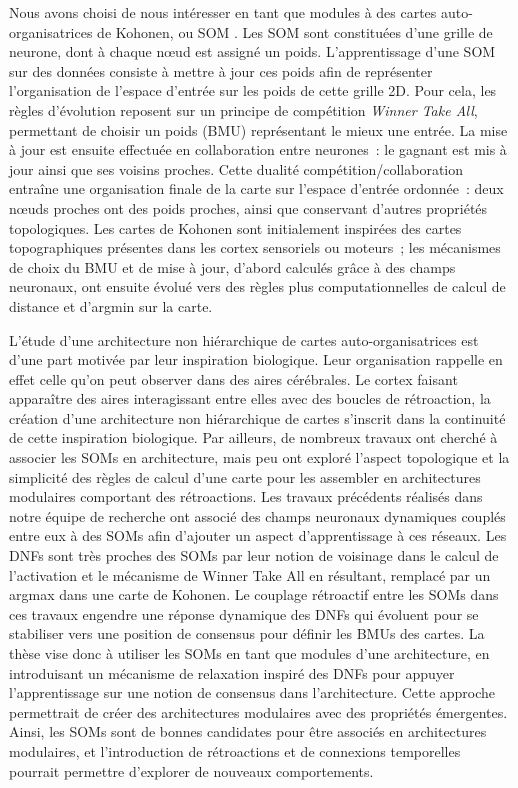 Nous avons choisi de nous intéresser en tant que modules à des cartes auto-organisatrices de Kohonen, ou SOM \cite{Kohonen1982}.
Les SOM sont constituées d'une grille de neurone, dont à chaque n\oe{}ud est assigné un poids.
L'apprentissage d'une SOM sur des données consiste à mettre à jour ces poids afin de représenter l'organisation de l'espace d'entrée sur les poids de cette grille 2D.
Pour cela, les règles d'évolution reposent sur un principe de compétition \emph{Winner Take All}, permettant de choisir un poids (BMU) représentant le mieux une entrée. La mise à jour est ensuite effectuée en collaboration entre neurones~: le gagnant est mis à jour ainsi que ses voisins proches. Cette dualité compétition/collaboration entraîne une organisation finale de la carte sur l'espace d'entrée ordonnée~: deux n\oe{}uds proches ont des poids proches, ainsi que conservant d'autres propriétés topologiques.
Les cartes de Kohonen sont initialement inspirées des cartes topographiques présentes dans les cortex sensoriels ou moteurs~; les mécanismes de choix du BMU et de mise à jour, d'abord calculés grâce à des champs neuronaux, ont ensuite évolué vers des règles plus computationnelles de calcul de distance et d'argmin sur la carte.


L'étude d'une architecture non hiérarchique de cartes auto-organisatrices est d'une part motivée par leur inspiration biologique. Leur organisation rappelle en effet celle qu'on peut observer dans des aires cérébrales. Le cortex faisant apparaître des aires interagissant entre elles avec des boucles de rétroaction, la création d'une architecture non hiérarchique de cartes s'inscrit dans la continuité de cette inspiration biologique.
Par ailleurs, de nombreux travaux ont cherché à associer les SOMs en architecture, mais peu ont exploré l'aspect topologique et la simplicité des règles de calcul d'une carte pour les assembler en architectures modulaires comportant des rétroactions. 
Les travaux précédents réalisés dans notre équipe de recherche ont associé des champs neuronaux dynamiques couplés entre eux à des SOMs afin d'ajouter un aspect d'apprentissage à ces réseaux. Les DNFs sont très proches des SOMs par leur notion de voisinage dans le calcul de l'activation et le mécanisme de Winner Take All en résultant, remplacé par un argmax dans une carte de Kohonen. Le couplage rétroactif entre les SOMs dans ces travaux engendre une réponse dynamique des DNFs qui évoluent pour se stabiliser vers une position de consensus pour définir les BMUs des cartes.
La thèse vise donc à utiliser les SOMs en tant que modules d'une architecture, en introduisant un mécanisme de relaxation inspiré des DNFs pour appuyer l'apprentissage sur une notion de consensus dans l'architecture. 
Cette approche permettrait de créer des architectures modulaires avec des propriétés émergentes. 
Ainsi, les SOMs sont de bonnes candidates pour être associés en architectures modulaires, et l'introduction de rétroactions et de connexions temporelles pourrait permettre d'explorer de nouveaux comportements.

